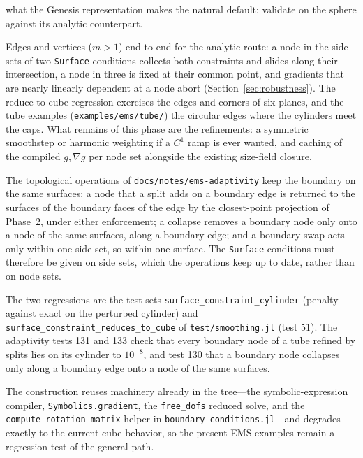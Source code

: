 \documentclass[11pt]{article}
\newcommand{\grad}{\nabla}
\newcommand{\code}[1]{\texttt{#1}}
\begin{document}
\begin{description}[style=unboxed,leftmargin=0pt,itemsep=2pt]
  what the Genesis representation makes the natural default; validate on the
  sphere against its analytic counterpart.
  \item[Phase 4 \emph{(edges and vertices implemented)}.] Edges and vertices
  ($m>1$) end to end for the analytic route: a node in the side sets of two
  \code{Surface} conditions collects both constraints and slides along their
  intersection, a node in three is fixed at their common point, and gradients
  that are nearly linearly dependent at a node abort
  (Section~\ref{sec:robustness}). The reduce-to-cube regression exercises the
  edges and corners of six planes, and the tube examples
  (\code{examples/\allowbreak ems/\allowbreak tube/}) the circular edges
  where the cylinders meet the caps. What remains of this phase are the
  refinements: a symmetric smoothstep or harmonic weighting if a $C^1$ ramp is
  ever wanted, and caching of the compiled $g,\grad g$ per node set alongside
  the existing size-field closure.
  \item[Use by the adaptivity loop \emph{(implemented)}.] The topological
  operations of \code{docs/\allowbreak notes/\allowbreak ems-adaptivity} keep the boundary on the same
  surfaces: a node that a split adds on a boundary edge is returned to the
  surfaces of the boundary faces of the edge by the closest-point projection
  of Phase~2, under either enforcement; a collapse removes a boundary node
  only onto a node of the same surfaces, along a boundary edge; and a boundary
  swap acts only within one side set, so within one surface. The
  \code{Surface} conditions must therefore be given on side sets, which the
  operations keep up to date, rather than on node sets.
\end{description}

The two regressions are the test sets \code{surface\_\allowbreak constraint\_\allowbreak cylinder}
(penalty against exact on the perturbed cylinder) and
\code{surface\_\allowbreak constraint\_\allowbreak reduces\_\allowbreak to\_\allowbreak cube} of \code{test/smoothing.jl}
(test 51). The adaptivity tests 131 and 133 check that every boundary node
of a tube refined by splits lies on its cylinder to $10^{-8}$, and test 130
that a boundary node collapses only along a boundary edge onto a node of the
same surfaces.

The construction reuses machinery already in the tree---the symbolic-expression
compiler, \code{Symbolics.gradient}, the \code{free\_dofs} reduced solve, and
the \code{compute\_rotation\_matrix} helper in
\code{boundary\_conditions.jl}---and degrades exactly to the current cube
behavior, so the present EMS examples remain a regression test of the general
path.
\end{document}
